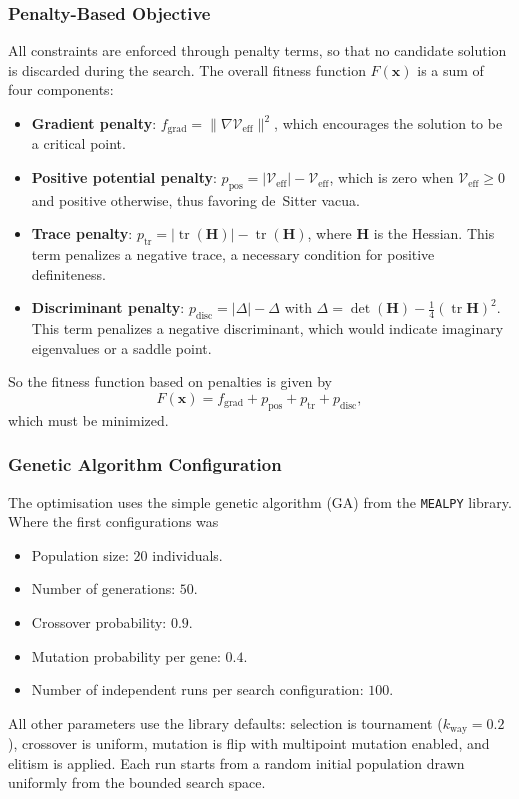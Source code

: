 \documentclass[runningheads]{llncs}
\begin{document}
\subsubsection{Penalty-Based Objective}
All constraints are enforced through penalty terms, so that no
candidate solution is discarded during the search. The overall
fitness function $F(\mathbf{x})$ is a sum of four components:

\begin{itemize}
    \item \textbf{Gradient penalty}: $f_{\mathrm{grad}} =
          \|\nabla\mathcal{V}_{\mathrm{eff}}\|^2$, which encourages
          the solution to be a critical point.
    \item \textbf{Positive potential penalty}: $p_{\mathrm{pos}} =
          |\mathcal{V}_{\mathrm{eff}}| - \mathcal{V}_{\mathrm{eff}}$,
          which is zero when $\mathcal{V}_{\mathrm{eff}}\ge0$ and
          positive otherwise, thus favoring de~Sitter vacua.
    \item \textbf{Trace penalty}: $p_{\mathrm{tr}} =
          |\operatorname{tr}(\mathbf{H})| - \operatorname{tr}(\mathbf{H})$,
          where $\mathbf{H}$ is the Hessian. This term penalizes
          a negative trace, a necessary condition for positive
          definiteness.
    \item \textbf{Discriminant penalty}: $p_{\mathrm{disc}} =
          |\Delta| - \Delta$ with $\Delta = \det(\mathbf{H}) -
          \frac{1}{4}(\operatorname{tr}\mathbf{H})^2$. This term
          penalizes a negative discriminant, which would indicate
          imaginary eigenvalues or a saddle point.
\end{itemize}
So the fitness function based on penalties is given by
\[
F(\mathbf{x}) = f_{\mathrm{grad}} + p_{\mathrm{pos}}
               + p_{\mathrm{tr}} + p_{\mathrm{disc}},
\]
which must be minimized.

\subsubsection{Genetic Algorithm Configuration}
The optimisation uses the simple genetic algorithm (GA) from
the \texttt{MEALPY} library. Where the first configurations was
\begin{itemize}
    \item Population size: $20$ individuals.
    \item Number of generations: $50$.
    \item Crossover probability: $0.9$.
    \item Mutation probability per gene: $0.4$.
    \item Number of independent runs per search configuration:
          $100$.
\end{itemize}
All other parameters use the library defaults: selection is
tournament ($k_{\text{way}}=0.2$), crossover is uniform,
mutation is flip with multipoint mutation enabled, and elitism
is applied. Each run starts from a random initial population
drawn uniformly from the bounded search space.
\end{document}
